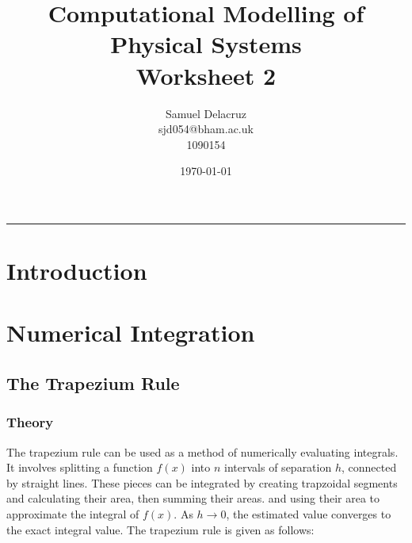 \documentclass[pdf,color]{UoBnote}
\author{Samuel Delacruz\\
				sjd054@bham.ac.uk\\
				1090154}
\title{Computational Modelling of Physical Systems\\Worksheet 2}
\date{\today}
\begin{document}

\maketitle
\tableofcontents
\listoffigures
\listoftables
\vspace{1cm}\hrule \vspace{1cm}
\newpage

\section{Introduction}
\section{Numerical Integration}
	\subsection{The Trapezium Rule}
		\subsubsection{Theory}
			The trapezium rule can be used as a method of numerically evaluating integrals. It involves splitting a function $f(x)$ into $n$ intervals of separation $h$,
			connected by straight lines. These pieces can be integrated by creating trapzoidal segments and calculating their area, then summing their areas.
			and using their area to approximate the integral of $f(x)$. As $h \rightarrow 0$, the estimated value converges to the exact integral value. The trapezium rule is given as follows:
			
\end{document}
